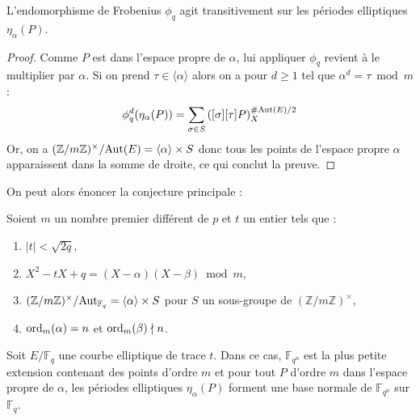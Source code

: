 \documentclass[a4paper]{article} %
\numberwithin{section}{part}
\numberwithin{equation}{section}
\newcommand\zmodninv[1]{(\mathbb{Z}/#1\mathbb{Z})^{\times}}
\newcommand\GF[1]{\mathbb{F}_{#1}}
\newcommand\groupgen[1]{\langle{#1}\rangle}
\newcommand\ord[2]{\textup{ord}_{#1}(#2)}
\begin{document}
\begin{prop}
L'endomorphisme de Frobenius $\phi_q$ agit transitivement sur les périodes 
elliptiques $\eta_{\alpha}(P)$.
\end{prop}
\begin{proof}
Comme $P$ est dans l'espace propre de $\alpha$, lui appliquer 
$\phi_q$ revient à le multiplier par $\alpha$. Si on prend 
$\tau\in\groupgen{\alpha}$ alors on a pour $d\geq1$ tel que $\alpha^d = \tau 
\bmod m$ :
\begin{equation}
\phi_q^d(\eta_{\alpha}(P)) = \sum_{\sigma\in
S}{\left([\sigma][\tau]P\right)_X^{\#\textup{Aut}(E)/2}}
\end{equation}
Or, on a $\zmodninv{m}/\textup{Aut}(E) = \groupgen{\alpha} \times S$ donc
tous les points de l'espace propre $\alpha$ apparaissent dans la somme de
droite, ce qui conclut la preuve.
\end{proof}
On peut alors énoncer la conjecture principale :
\begin{conj}
\label{conj:gaussellnorm}
Soient $m$ un nombre premier différent de $p$ et $t$ un entier tels que :
\vspace{0.3cm}
\begin{enumerate}[1.]
    \item $|t| < \sqrt{2q}$,
    \item $X^2 - tX + q = (X - \alpha)(X - \beta)\bmod{m}$,
    \item $\zmodninv{m}/\textup{Aut}_{\GF{q}} = \groupgen{\alpha}\times S$ pour
    $S$ un sous-groupe de $\zmodninv{m}$,
    \item $\ord{m}{\alpha} = n$ et $\ord{m}{\beta}\nmid n$.
\end{enumerate}
\vspace{0.3cm}
Soit $E/\GF{q}$ une courbe elliptique de trace $t$. Dans ce cas, $\GF{q^n}$ est
la plus petite extension contenant des points d'ordre $m$ et pour tout $P$ 
d'ordre $m$ dans l'espace propre de $\alpha$, les périodes elliptiques $\eta_
{\alpha}(P)$ forment une base normale de $\GF{q^n}$ sur $\GF{q}$.\par
\end{conj}
\end{document}
